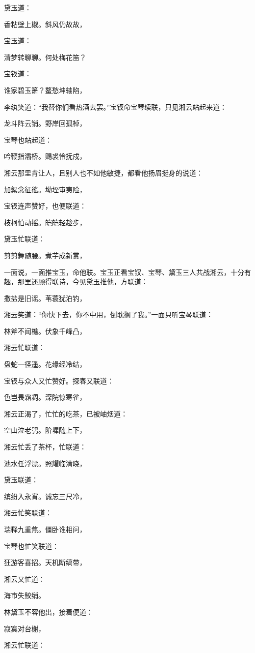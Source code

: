 黛玉道：

香粘壁上椒。斜风仍故故，

宝玉道：

清梦转聊聊。何处梅花笛？

宝钗道：

谁家碧玉箫？鳌愁坤轴陷，

李纨笑道：``我替你们看热酒去罢。''宝钗命宝琴续联，只见湘云站起来道：

龙斗阵云销。野岸回孤棹，

宝琴也站起道：

吟鞭指灞桥。赐裘怜抚戍，

湘云那里肯让人，且别人也不如他敏捷，都看他扬眉挺身的说道：

加絮念征徭。坳垤审夷险，

宝钗连声赞好，也便联道：

枝柯怕动摇。皑皑轻趁步，

黛玉忙联道：

剪剪舞随腰。煮芋成新赏，

一面说，一面推宝玉，命他联。宝玉正看宝钗、宝琴、黛玉三人共战湘云，十分有趣，那里还顾得联诗，今见黛玉推他，方联道：

撒盐是旧谣。苇蓑犹泊钓，

湘云笑道：``你快下去，你不中用，倒耽搁了我。''一面只听宝琴联道：

林斧不闻樵。伏象千峰凸，

湘云忙联道：

盘蛇一径遥。花缘经冷结，

宝钗与众人又忙赞好。探春又联道：

色岂畏霜凋。深院惊寒雀，

湘云正渴了，忙忙的吃茶，已被岫烟道：

空山泣老鸮。阶墀随上下，

湘云忙丢了茶杯，忙联道：

池水任浮漂。照耀临清晓，

黛玉联道：

缤纷入永宵。诚忘三尺冷，

湘云忙笑联道：

瑞释九重焦。僵卧谁相问，

宝琴也忙笑联道：

狂游客喜招。天机断缟带，

湘云又忙道：

海市失鲛绡。

林黛玉不容他出，接着便道：

寂寞对台榭，

湘云忙联道：

